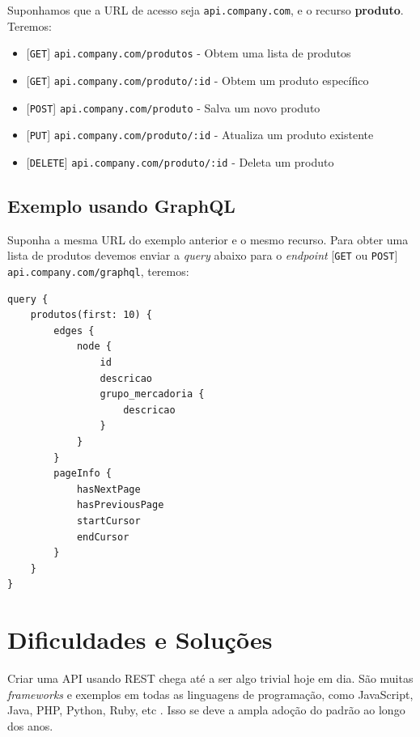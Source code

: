 Suponhamos que a URL de acesso seja \texttt{api.company.com}, e o
recurso \textbf{produto}. Teremos:

\begin{itemize}
\itemsep1pt\parskip0pt
\item
  {[}\texttt{GET}{]} \texttt{api.company.com/produtos} - Obtem uma lista
  de produtos
\item
  {[}\texttt{GET}{]} \texttt{api.company.com/produto/:id} - Obtem um
  produto específico
\item
  {[}\texttt{POST}{]} \texttt{api.company.com/produto} - Salva um novo
  produto
\item
  {[}\texttt{PUT}{]} \texttt{api.company.com/produto/:id} - Atualiza um
  produto existente
\item
  {[}\texttt{DELETE}{]} \texttt{api.company.com/produto/:id} - Deleta um
  produto
\end{itemize}

\subsection{Exemplo usando GraphQL}\label{exemplo-usando-graphql}

Suponha a mesma URL do exemplo anterior e o mesmo recurso. Para obter
uma lista de produtos devemos enviar a \emph{query} abaixo para o
\emph{endpoint} {[}\texttt{GET} ou \texttt{POST}{]} \newline
\texttt{api.company.com/graphql}, teremos:

\begin{verbatim}
query {
    produtos(first: 10) {
        edges {
            node {
                id
                descricao
                grupo_mercadoria {
                    descricao
                }
            }
        }
        pageInfo {
            hasNextPage
            hasPreviousPage
            startCursor
            endCursor
        }
    }
}
\end{verbatim}

\section{Dificuldades e Soluções}\label{dificuldades-e-soluuxe7uxf5es}

Criar uma API usando REST chega até a ser algo trivial hoje em dia. São
muitas \emph{frameworks} e exemplos em todas as linguagens de
programação, como JavaScript, Java, PHP, Python, Ruby, etc
\cite{awesome-rest:2017}. Isso se deve a ampla adoção do padrão ao longo
dos anos.

